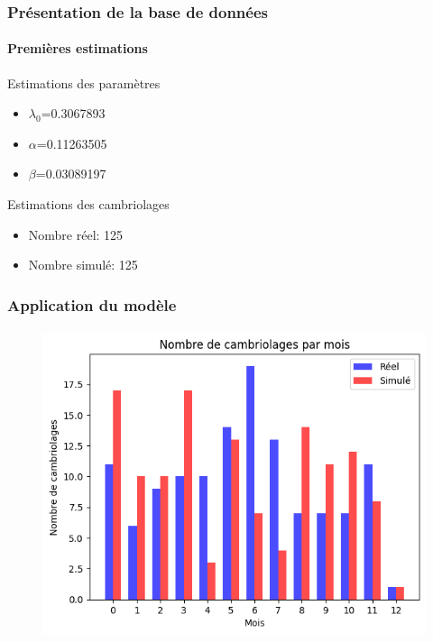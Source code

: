 \begin{frame}
	\frametitle{Présentation de la base de données}
	\framesubtitle{Premières estimations}
         \begin{block}{Estimations des paramètres}
         \begin{itemize}
            \item $\lambda_0$=0.3067893
            \item $\alpha$=0.11263505
            \item $\beta$=0.03089197
            \end{itemize}
  
  \end{block}

  \begin{block}{Estimations des cambriolages}
         \begin{itemize}
            \item Nombre réel: 125 
            \item Nombre simulé: 125
            \end{itemize}
  
  \end{block}
\end{frame}

\begin{frame}
    \frametitle{Application du modèle}
    \framesubtitle{}
        \begin{figure}
            \centering
            \includegraphics[width=0.6\linewidth]{figures/téléchargement (3).png}
        \end{figure}
\end{frame}

